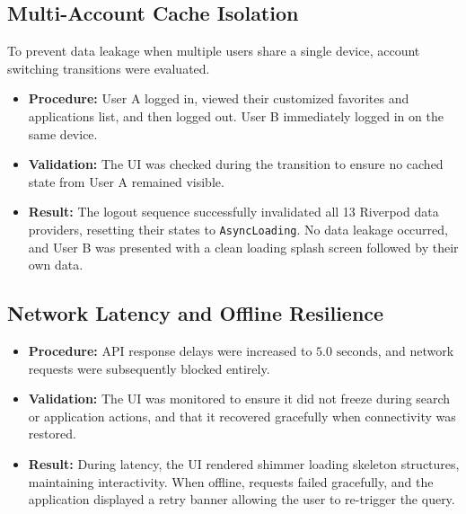 \subsection{Multi-Account Cache Isolation}
To prevent data leakage when multiple users share a single device, account switching transitions were evaluated.
\begin{itemize}
    \item \textbf{Procedure:} User A logged in, viewed their customized favorites and applications list, and then logged out. User B immediately logged in on the same device.
    \item \textbf{Validation:} The UI was checked during the transition to ensure no cached state from User A remained visible.
    \item \textbf{Result:} The logout sequence successfully invalidated all 13 Riverpod data providers, resetting their states to \texttt{AsyncLoading}. No data leakage occurred, and User B was presented with a clean loading splash screen followed by their own data.
\end{itemize}

\subsection{Network Latency and Offline Resilience}
\begin{itemize}
    \item \textbf{Procedure:} API response delays were increased to $5.0\text{ seconds}$, and network requests were subsequently blocked entirely.
    \item \textbf{Validation:} The UI was monitored to ensure it did not freeze during search or application actions, and that it recovered gracefully when connectivity was restored.
    \item \textbf{Result:} During latency, the UI rendered shimmer loading skeleton structures, maintaining interactivity. When offline, requests failed gracefully, and the application displayed a retry banner allowing the user to re-trigger the query.
\end{itemize}

